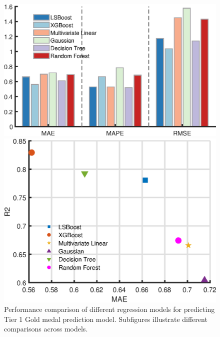 \documentclass{mcmthesis}
\begin{document}
\begin{figure}[!htbp]
    \vspace{0.2cm} %

    \begin{minipage}[t]{0.52\textwidth}
        \centering
        \includegraphics[width=\textwidth, keepaspectratio]{pics/multi-regression-compare.eps}
    \end{minipage}
    \hfill
    \begin{minipage}[t]{0.44\textwidth}
        \centering
        \includegraphics[width=\textwidth, keepaspectratio]{pics/multi-regression-compare-2.eps}
    \end{minipage}
    
    \caption{Performance comparison of different regression models for predicting Tier 1 Gold medal prediction model. Subfigures illustrate different comparisons across models.}
    \label{fig:model_comparison}
\end{figure}
\end{document}
